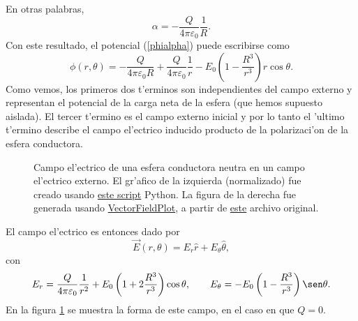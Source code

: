 En otras palabras, 
\begin{equation}
\alpha=-\frac{Q}{4\pi \varepsilon_0}\frac{1}{R}.
\end{equation}
Con este resultado, el potencial (\ref{phialpha}) puede escribirse como 
\begin{equation}
\phi(r,\theta)=-\frac{Q}{4\pi\varepsilon_0 R}+\frac{Q}{4\pi\varepsilon_0}\frac{1}{r} -E_0 \left(1-\frac{R^3}{r^3}\right)r\cos\theta.
\end{equation}
Como vemos, los primeros dos t'erminos son independientes del campo externo y representan el potencial de la carga neta de la esfera (que hemos supuesto aislada). El tercer t'ermino es el campo externo inicial y por lo tanto el 'ultimo t'ermino describe el campo el'ectrico inducido producto de la polarizaci'on de la esfera conductora.
\begin{figure}[!h]
\centerline{
\hspace{1cm}}
\caption{Campo el'ectrico de una esfera conductora neutra en un campo el'ectrico externo. El gr'afico de la izquierda (normalizado) fue creado usando \href{https://github.com/gfrubi/electrodinamica/blob/master/figuras-editables/fig-esfera-conductora-campo-externo-raw.py}{este script} Python. La figura de la derecha fue generada usando \href{http://commons.wikimedia.org/wiki/User:Geek3/VectorFieldPlot}{VectorFieldPlot}, a partir de \href{http://commons.wikimedia.org/wiki/File:VFPt_superconductor_ball_E-field.svg}{este} archivo original.}
\label{fig:ecce}
\end{figure}
El campo el'ectrico es entonces dado por
\begin{equation}
\vec{E}(r,\theta)=E_r\hat{r}+E_\theta\hat{\theta},
\end{equation}
con 
\begin{equation}
E_r=\frac{Q}{4\pi\varepsilon_0}\frac{1}{r^2}+E_0 \left(1+2\frac{R^3}{r^3}\right)\cos\theta, \qquad E_\theta=-E_0 \left(1-\frac{R^3}{r^3}\right)\sen\theta .
\end{equation}
En la figura \ref{fig:ecce} se muestra la forma de este campo, en el caso en que $Q=0$.




